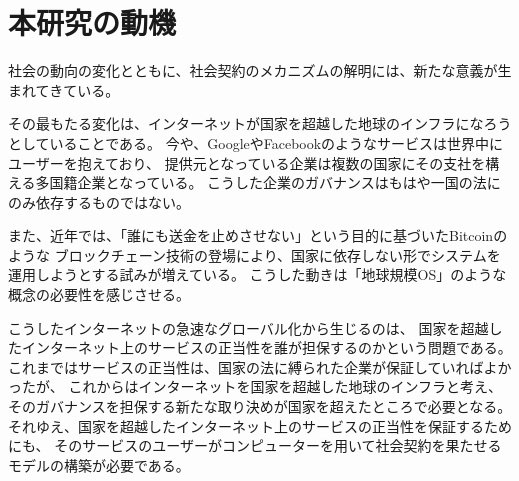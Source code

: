 



  \section{本研究の動機}
  社会の動向の変化とともに、社会契約のメカニズムの解明には、新たな意義が生まれてきている。

  その最もたる変化は、インターネットが国家を超越した地球のインフラになろうとしていることである。
  今や、GoogleやFacebookのようなサービスは世界中にユーザーを抱えており、
  提供元となっている企業は複数の国家にその支社を構える多国籍企業となっている。
  こうした企業のガバナンスはもはや一国の法にのみ依存するものではない。

  また、近年では、「誰にも送金を止めさせない」という目的に基づいたBitcoinのような
  ブロックチェーン技術の登場により、国家に依存しない形でシステムを運用しようとする試みが増えている。
  こうした動きは「地球規模OS」のような概念の必要性を感じさせる。
  
  こうしたインターネットの急速なグローバル化から生じるのは、
  国家を超越したインターネット上のサービスの正当性を誰が担保するのかという問題である。
  これまではサービスの正当性は、国家の法に縛られた企業が保証していればよかったが、
  これからはインターネットを国家を超越した地球のインフラと考え、
  そのガバナンスを担保する新たな取り決めが国家を超えたところで必要となる。
  それゆえ、国家を超越したインターネット上のサービスの正当性を保証するためにも、
  そのサービスのユーザーがコンピューターを用いて社会契約を果たせるモデルの構築が必要である。

